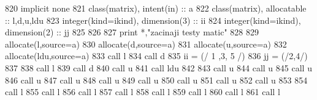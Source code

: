 \begin{DoxyCode}
820         \textcolor{keywordtype}{implicit none}
821         \textcolor{keywordtype}{class}(matrix), \textcolor{keywordtype}{intent(in)} :: a
822         \textcolor{keywordtype}{class}(matrix), \textcolor{keywordtype}{allocatable} :: l,d,u,ldu
823         \textcolor{keywordtype}{integer(kind=ikind)}, \textcolor{keywordtype}{dimension(3)} :: ii
824         \textcolor{keywordtype}{integer(kind=ikind)}, \textcolor{keywordtype}{dimension(2)} :: jj
825 
826 
827         print *,\textcolor{stringliteral}{"zacinaji testy matic"}
828 
829         \textcolor{keyword}{allocate}(l,source=a)
830         \textcolor{keyword}{allocate}(d,source=a)
831         \textcolor{keyword}{allocate}(u,source=a)
832         \textcolor{keyword}{allocate}(ldu,source=a)
833         \textcolor{keyword}{call }l%
834         \textcolor{keyword}{call }d%
835         ii = (/ 1 ,3, 5 /)
836         jj = (/2,4/)
837 
838         \textcolor{keyword}{call }l%
839         \textcolor{keyword}{call }d%
840         \textcolor{keyword}{call }u%
841         \textcolor{keyword}{call }ldu%
842 
843         \textcolor{keyword}{call }u%
844         \textcolor{keyword}{call }u%
845         \textcolor{keyword}{call }u%
846         \textcolor{keyword}{call }u%
847         \textcolor{keyword}{call }u%
848         \textcolor{keyword}{call }u%
849         \textcolor{keyword}{call }u%
850         \textcolor{keyword}{call }u%
851         \textcolor{keyword}{call }u%
852         \textcolor{keyword}{call }u%
853 
854         \textcolor{keyword}{call }l%
855         \textcolor{keyword}{call }l%
856         \textcolor{keyword}{call }l%
857         \textcolor{keyword}{call }l%
858         \textcolor{keyword}{call }l%
859         \textcolor{keyword}{call }l%
860         \textcolor{keyword}{call }l%
861         \textcolor{keyword}{call }l%

\end{DoxyCode}
